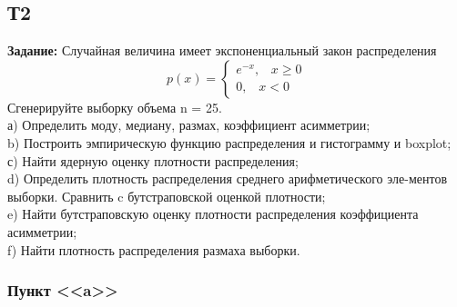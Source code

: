\subsection{Т2}

\textbf{Задание:}
Случайная величина имеет экспоненциальный закон распределения\\
\begin{equation*}
    p(x) = \left\{\begin{aligned}
        e^{-x}, \;\;\;x\geqslant0\\
        0, \;\;\;x<0
\end{aligned}\right.
\end{equation*}
Сгенерируйте выборку объема n = 25.\\
а) Определить моду, медиану, размах, коэффициент асимметрии; \\
b) Построить эмпирическую функцию распределения и гистограмму и boxplot;\\
с) Найти ядерную оценку плотности распределения;\\
d) Определить плотность распределения среднего арифметического эле-ментов выборки. Сравнить c бутстраповской оценкой плотности;\\
e) Найти бутстраповскую оценку плотности распределения коэффициента асимметрии;\\
f) Найти плотность распределения размаха выборки.\\
\subsubsection{Пункт <<a>>}

\newpage